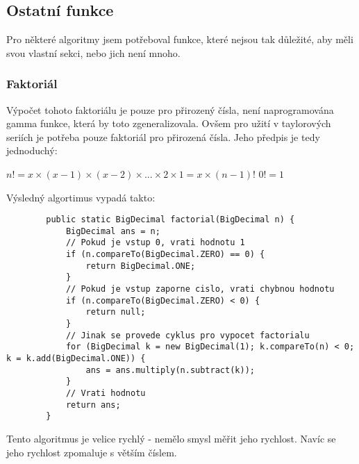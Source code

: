 \documentclass{article}
\begin{document}
    \subsection{Ostatní funkce}
    Pro některé algoritmy jsem potřeboval funkce, které nejsou tak důležité, aby měli svou vlastní sekci, nebo jich
    není mnoho.
    \subsubsection{Faktoriál}
    Výpočet tohoto faktoriálu je pouze pro přirozený čísla, není naprogramována gamma funkce, která by toto zgeneralizovala.
    Ovšem pro užití v taylorových seriích je potřeba pouze faktoriál pro přirozená čísla. Jeho předpis je tedy jednoduchý:
    \begin{center}
        $n! = x\times{(x-1)}\times{(x-2)}\times{...}\times{2}\times{1} = x\times{(n-1)!}$\newline
        $0! = 1$
    \end{center}
    Výsledný algortimus vypadá takto:
    \begin{lstlisting}
        public static BigDecimal factorial(BigDecimal n) {
            BigDecimal ans = n;
            // Pokud je vstup 0, vrati hodnotu 1
            if (n.compareTo(BigDecimal.ZERO) == 0) {
                return BigDecimal.ONE;
            }
            // Pokud je vstup zaporne cislo, vrati chybnou hodnotu
            if (n.compareTo(BigDecimal.ZERO) < 0) {
                return null;
            }
            // Jinak se provede cyklus pro vypocet factorialu
            for (BigDecimal k = new BigDecimal(1); k.compareTo(n) < 0; k = k.add(BigDecimal.ONE)) {
                ans = ans.multiply(n.subtract(k));
            }
            // Vrati hodnotu
            return ans;
        }
    \end{lstlisting}
    Tento algoritmus je velice rychlý - nemělo smysl měřit jeho rychlost. Navíc se jeho rychlost zpomaluje s větším číslem.
\end{document}
